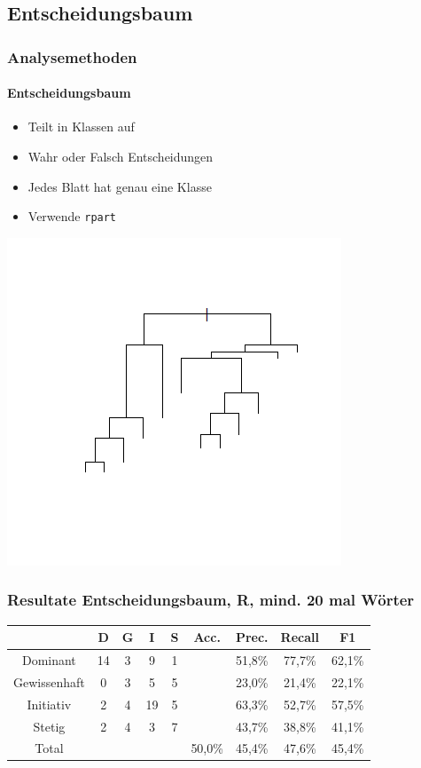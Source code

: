 \documentclass{beamer}
\begin{document}
\subsection{Entscheidungsbaum}
\begin{frame}
\frametitle{Analysemethoden}
\framesubtitle{Entscheidungsbaum}
\begin{itemize}\setlength\parskip{12pt}
\item Teilt in Klassen auf
\item Wahr oder Falsch Entscheidungen
\item Jedes Blatt hat genau eine Klasse
\item Verwende \texttt{rpart}
\end{itemize}
\begin{center}
	\includegraphics[scale=0.5]{RPart.png}
\end{center}
\end{frame}
\begin{frame}
\frametitle{Resultate Entscheidungsbaum, R, mind. 20 mal Wörter}
\begin{center}
\begin{tabular}{|c|c|c|c|c|c|c|c|c|}
\hline
 &  D 	& G	& I & S	& Acc.	& Prec. & Recall	& F1\\
\hline
Dominant & 14 & 3 & 9 & 1 & & 51,8\% & 77,7\% & 62,1\% \\
Gewissenhaft & 0 & 3 & 5 & 5& &23,0\% & 21,4\% & 22,1\%\\
Initiativ & 2 & 4 & 19 & 5& &63,3\% & 52,7\% & 57,5\%\\
Stetig & 2 & 4 & 3 & 7& &43,7\% & 38,8\% & 41,1\% \\
\hline
Total 	&		&		& & 		& 50,0\%	& 45,4\% & 47,6\% & 45,4\%\\
\hline
\end{tabular}
\end{center}
\end{frame}
\end{document}
